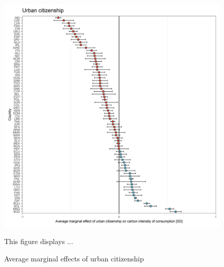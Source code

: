 \documentclass[12pt, a4paper]{article}
\newenvironment{subcaption}
{\strut
\vspace{-5pt}
\begin{minipage}[b]{0.9\textwidth}
  \hspace*{-\parindent}
  \footnotesize}
 {\end{minipage}}
\begin{document}
\begin{figure}[ht!]
  \centering
 \caption{Average marginal effects of urban citizenship} \label{fig:E5_Urban}
  \includegraphics{Analysis_OLS_ME_Carbon_Intensity/AME_OLS_CI_urban_01}
  \begin{subcaption}
    This figure displays ...
  \end{subcaption}

\end{figure}

\clearpage
\end{document}
